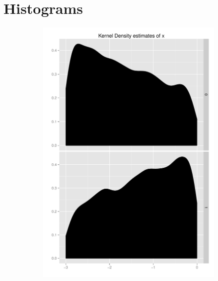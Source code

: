 \documentclass[11pt,letterpaper]{article}
\begin{document}
\section{Histograms}
\begin{landscape}
\begin{figure}[h]
	\centering
	\begin{subfigure}[b]{0.3\textwidth}\centering \includegraphics[width=1\textwidth]{x}  \end{subfigure}

\end{figure}
\end{landscape}
\end{document}

